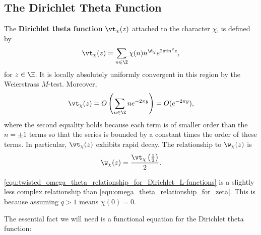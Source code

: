     \subsection*{The Dirichlet Theta Function}
      The \textbf{Dirichlet theta function} $\vt_{\chi}(z)$ attached to the character $\chi$, is defined by
      \[
        \vt_{\chi}(z) = \sum_{n \in \Z}\chi(n)n^{\d_{\chi}}e^{2\pi in^{2}z},
      \]
      for $z \in \H$. It is locally absolutely uniformly convergent in this region by the Weierstrass $M$-test. Moreover,
      \[
        \vt_{\chi}(z) = O\left(\sum_{n \in \Z}ne^{-2\pi y}\right) = O(e^{-2\pi y}),
      \]
      where the second equality holds because each term is of smaller order than the $n = \pm 1$ terms so that the series is bounded by a constant times the order of these terms. In particular, $\vt_{\chi}(z)$ exhibits rapid decay. The relationship to $\w_{\chi}(z)$ is
      \begin{equation}\label{equ:twisted_omega_theta_relationship_for_Dirichlet_L-functions}
        \w_{\chi}(z) = \frac{\vt_{\chi}\left(\frac{z}{2}\right)}{2}.
      \end{equation}

      \begin{remark}
        \cref{equ:twisted_omega_theta_relationship_for_Dirichlet_L-functions} is a slightly less complex relationship than \cref{equ:omega_theta_relationship_for_zeta}. This is because assuming $q > 1$ means $\chi(0) = 0$.
      \end{remark}

      The essential fact we will need is a functional equation for the Dirichlet theta function:

